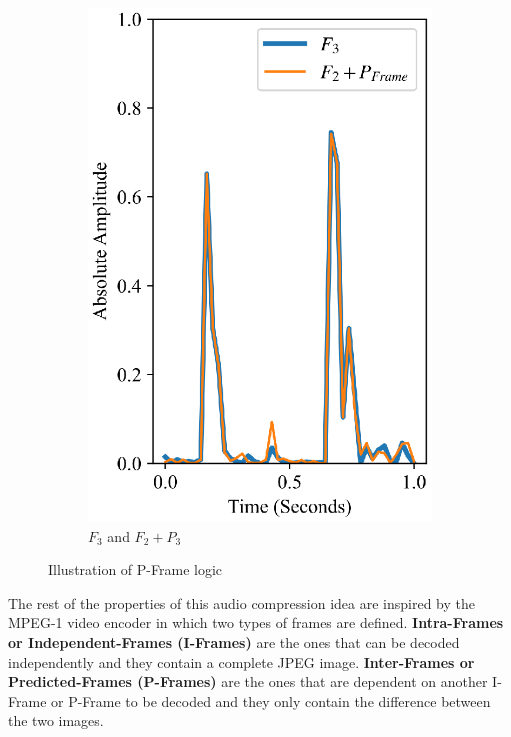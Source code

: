 \begin{figure}[ht]
\begin{subfigure}{0.24\textwidth}
        \includegraphics[width=\linewidth]{Figures/chap4/proposed/f3f2+p.eps}        
        \caption{$F_3$ and $F_2+P_3$}
        \label{fig:f3f2p}
    \end{subfigure}
    \caption{Illustration of P-Frame logic}
    \label{fig:pframe-logic}
\end{figure}

The rest of the properties of this audio compression idea are inspired by the MPEG-1 video encoder in which two types of frames are defined. \textbf{Intra-Frames or Independent-Frames (I-Frames)} are the ones that can be decoded independently and they contain a complete JPEG image. \textbf{Inter-Frames or Predicted-Frames (P-Frames)} are the ones that are dependent on another I-Frame or P-Frame to be decoded and they only contain the difference between the two images. 

